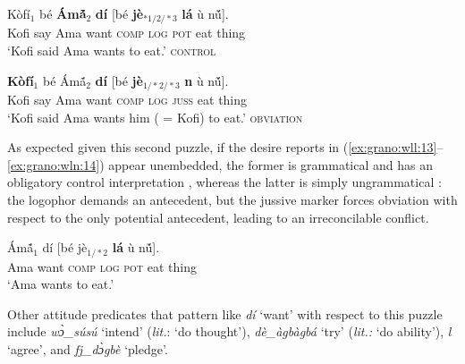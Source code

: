 \documentclass[output=paper,modfonts,nonflat]{langsci/langscibook}
\begin{document}
\ea
\gll K\`of\'i$_{1}$ b\'e \textbf{\'Am\'{\~a}$_{2}$} \textbf{d{\Z}\'i} [b\'e \textbf{j\`e$_{*1/2/*3}$} \textbf{l\'a} {\D}\`u n\'{\~u}].\\
Kofi say Ama want \textsc{comp} \textsc{log} \textsc{pot} eat thing\\
\glt `Kofi said Ama wants to eat.' \label{ex:grano:wll:13}  \hfill \textsc{control}%
\z

\ea
\gll \textbf{K\`of\'i$_{1}$} b\'e  \'Am\'{\~a}$_{2}$ \textbf{d{\Z}\'i} [b\'e \textbf{j\`e$_{1/*2/*3}$} \textbf{n{\É}} {\D}\`u n\'{\~u}].\\
Kofi say Ama want \textsc{comp} \textsc{log} \textsc{juss} eat thing\\
\glt `Kofi said Ama wants him ( = Kofi) to eat.' \label{ex:grano:wln:14}  \hfill \textsc{obviation}
\z


As expected given this second puzzle, if the desire reports in (\ref{ex:grano:wll:13}--\ref{ex:grano:wln:14}) appear unembedded, the former is grammatical and has an obligatory control interpretation , whereas the latter is simply ungrammatical : the logophor demands an antecedent, but the jussive marker forces obviation with respect to the only potential antecedent, leading to an irreconcilable conflict.

\ea
\gll  \'Am\'{\~a}$_{1}$  d{\Z}\'i [b\'e  j\`e$_{1/*2}$ \textbf{l\'a} {\D}\`u n\'{\~u}].\\
Ama want \textsc{comp} \textsc{log} \textsc{pot} eat thing\\
\glt `Ama wants to eat.' \label{ex:grano:wll':15}  %
\z

\z

 Other attitude predicates that pattern like \emph{d{\Z}\'i} `want' with respect to this puzzle include \emph{w{\`{ɔ}}\_s\'us\'u} `intend' (\emph{lit.}: `do thought'), \emph{d{\Z}\`e\_\`agb\`agb\'a} `try' (\emph{lit.:} `do ability'), \emph{l{\Ò}} `agree', and \emph{fj{\È}\_d{\Z}{\`{ɔ}}gb\`e} `pledge'. 
\end{document}
